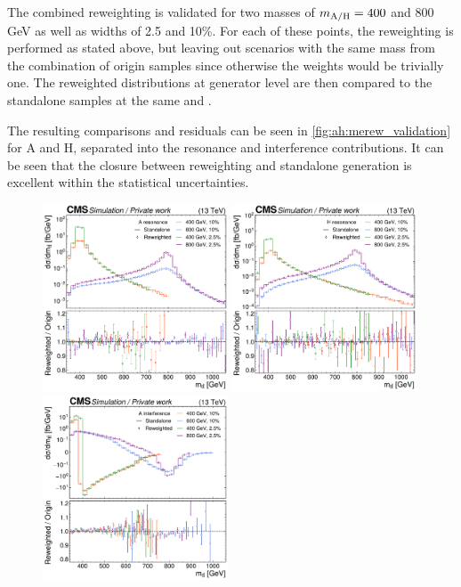 The combined reweighting is validated for two masses of $m_{\mathrm{A/H}} = 400$ and 800 GeV as well as widths of 2.5 and 10\%. For each of these points, the reweighting is performed as stated above, but leaving out \AH scenarios with the same mass from the combination of origin samples since otherwise the weights would be trivially one. The reweighted \mtt distributions at generator level are then compared to the standalone samples at the same \mAH and \wAH.

The resulting comparisons and residuals can be seen in \cref{fig:ah:merew_validation} for A and H, separated into the resonance and interference contributions. It can be seen that the closure between reweighting and standalone generation is excellent within the statistical uncertainties.

\begin{figure}[!p]
    \centering
    \includegraphics[width=0.49\textwidth]{figures/ah/me_reweighting/A_res.pdf}
    \hfill
    \includegraphics[width=0.49\textwidth]{figures/ah/me_reweighting/H_res.pdf}
    \includegraphics[width=0.49\textwidth]{figures/ah/me_reweighting/A_int.pdf}

\end{figure}
